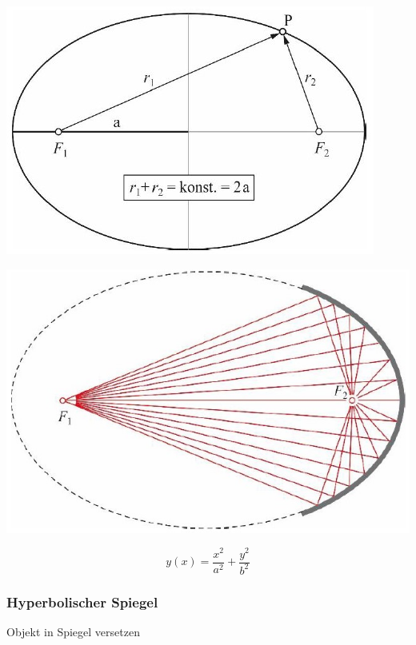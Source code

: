 \begin{minipage}{0.48\linewidth}
\includegraphics[width=\linewidth]{Bilder/Wellen-Optik/elliptischer_spiegel} 
\end{minipage}
\hfill
\begin{minipage}{0.48\linewidth}
\includegraphics[width=\linewidth]{Bilder/Wellen-Optik/elliptischer_spiegel_2} 
\end{minipage}

$$ \boxed{ y(x) = \frac{x^2}{a^2} + \frac{y^2}{b^2} } $$




\subsubsection{Hyperbolischer Spiegel}

Objekt in Spiegel versetzen \\

